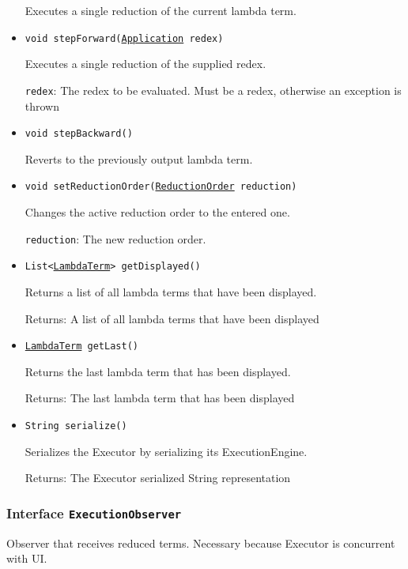 \begin{itemize}
Executes a single reduction of the current lambda term.

\item \texttt{void stepForward(\hyperref[type:edu.kit.wavelength.client.model.term.Application]{Application} redex)}

Executes a single reduction of the supplied redex.

\texttt{redex}: The redex to be evaluated. Must be a redex, otherwise
 an exception is thrown

\item \texttt{void stepBackward()}

Reverts to the previously output lambda term.

\item \texttt{void setReductionOrder(\hyperref[type:edu.kit.wavelength.client.model.reduction.ReductionOrder]{ReductionOrder} reduction)}

Changes the active reduction order to the entered one.

\texttt{reduction}: The new reduction order.

\item \texttt{List<\hyperref[type:edu.kit.wavelength.client.model.term.LambdaTerm]{LambdaTerm}> getDisplayed()}

Returns a list of all lambda terms that have been displayed.

Returns: A list of all lambda terms that have been displayed

\item \texttt{\hyperref[type:edu.kit.wavelength.client.model.term.LambdaTerm]{LambdaTerm} getLast()}

Returns the last lambda term that has been displayed.

Returns: The last lambda term that has been displayed

\item \texttt{String serialize()}

Serializes the Executor by serializing its ExecutionEngine.

Returns: The Executor serialized String representation

\end{itemize}

\subsubsection{Interface \texttt{ExecutionObserver}}
\label{type:edu.kit.wavelength.client.view.execution.ExecutionObserver}
Observer that receives reduced terms. Necessary because Executor is concurrent with UI.

